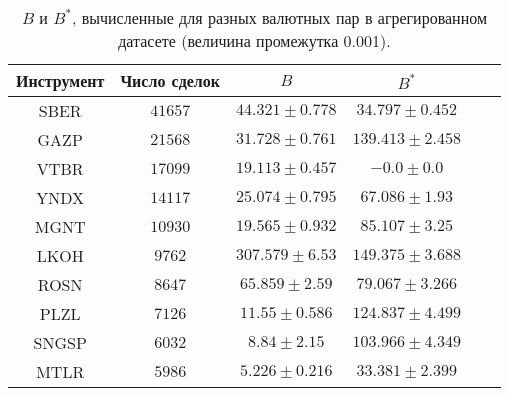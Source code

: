 \begin{table}[h!]
    \begin{center}
        \begin{tabular}{|c|c|c|c|c|c|}
            \hline
            Инструмент & Число сделок & $B$                & $B ^*$              \\ \hline
            SBER & $41657$ & $44.321 \pm 0.778$ & $34.797 \pm 0.452$ \\ \hline
            GAZP       & $21568$      & $31.728 \pm 0.761$ & $139.413 \pm 2.458$ \\ \hline
            VTBR       & $17099$      & $19.113 \pm 0.457$ & $-0.0 \pm 0.0$      \\ \hline
            YNDX       & $14117$      & $25.074 \pm 0.795$ & $67.086 \pm 1.93$   \\ \hline
            MGNT       & $10930$      & $19.565 \pm 0.932$ & $85.107 \pm 3.25$   \\ \hline
            LKOH       & $9762$       & $307.579 \pm 6.53$ & $149.375 \pm 3.688$ \\ \hline
            ROSN       & $8647$       & $65.859 \pm 2.59$  & $79.067 \pm 3.266$  \\ \hline
            PLZL       & $7126$       & $11.55 \pm 0.586$  & $124.837 \pm 4.499$ \\ \hline
            SNGSP      & $6032$       & $8.84 \pm 2.15$    & $103.966 \pm 4.349$ \\ \hline
            MTLR       & $5986$       & $5.226 \pm 0.216$  & $33.381 \pm 2.399$  \\ \hline
        \end{tabular}
    \end{center}\caption{$B$ и $B ^*$, вычисленные для разных валютных пар в агрегированном датасете (величина промежутка 0.001).}
    \label{Aggreg1CU0.001} \end{table}


